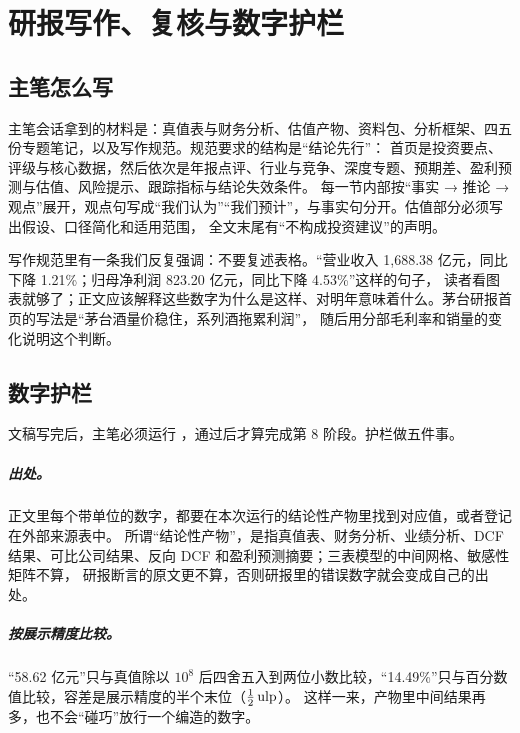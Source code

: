 \chapter{研报写作、复核与数字护栏}

\section{主笔怎么写}

主笔会话拿到的材料是：真值表与财务分析、估值产物、资料包、分析框架、四五份专题笔记，以及写作规范。规范要求的结构是“结论先行”：
首页是投资要点、评级与核心数据，然后依次是年报点评、行业与竞争、深度专题、预期差、盈利预测与估值、风险提示、跟踪指标与结论失效条件。
每一节内部按“事实 → 推论 → 观点”展开，观点句写成“我们认为”“我们预计”，与事实句分开。估值部分必须写出假设、口径简化和适用范围，
全文末尾有“不构成投资建议”的声明。

写作规范里有一条我们反复强调：不要复述表格。“营业收入 1,688.38 亿元，同比下降 1.21\%；归母净利润 823.20 亿元，同比下降 4.53\%”这样的句子，
读者看图表就够了；正文应该解释这些数字为什么是这样、对明年意味着什么。茅台研报首页的写法是“茅台酒量价稳住，系列酒拖累利润”，
随后用分部毛利率和销量的变化说明这个判断。

\section{数字护栏}

文稿写完后，主笔必须运行 ，通过后才算完成第 8 阶段。护栏做五件事。

\paragraph{出处。}正文里每个带单位的数字，都要在本次运行的结论性产物里找到对应值，或者登记在外部来源表中。
所谓“结论性产物”，是指真值表、财务分析、业绩分析、DCF 结果、可比公司结果、反向 DCF 和盈利预测摘要；三表模型的中间网格、敏感性矩阵不算，
研报断言的原文更不算，否则研报里的错误数字就会变成自己的出处。

\paragraph{按展示精度比较。}“58.62 亿元”只与真值除以 $10^8$ 后四舍五入到两位小数比较，“14.49\%”只与百分数值比较，容差是展示精度的半个末位（$\tfrac12\,\mathrm{ulp}$）。
这样一来，产物里中间结果再多，也不会“碰巧”放行一个编造的数字。

